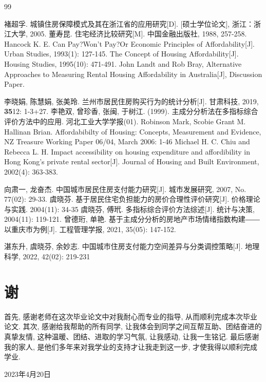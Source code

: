 \documentclass[a4paper, 12pt, twoside]{ctexart}
\def\authorname{许} %
\begin{document}
\begin{thebibliography}{99}
\setlength{\itemsep}{-0.75ex}

褚超孚. 城镇住房保障模式及其在浙江省的应用研究[D]. [硕士学位论文], 浙江：浙江大学, 2005.
董寿昆. 住宅经济比较研究[M]. 中国金融出版社, 1988, 257-258.
Hancock K. E. Can Pay?Won't Pay?Or Economic Principles of Affordability[J]. Urban Studies, 1993(1): 127-145.
The Concept of Housing Affordability[J]. Housing Studies, 1995(10): 471-491.
John Landt and Rob Bray, Alternative Approaches to Measuring Rental Housing Affordability in Australia[J], Discussion Paper.

李晓娟, 陈慧娟, 张美玲. 兰州市居民住房购买行为的统计分析[J]. 甘肃科技, 2019, \textbf{35}12: 1-3+27.
李艳双, 曾珍香, 张闽, 于树江. (1999). 主成分分析法在多指标综合评价方法中的应用. 河北工业大学学报(01).
Robinson Mark, Scobie Grant M. Hallinan Brian. Affordabibilty of Housing: Concepts, Measurement and Evidence, NZ Treasure Working Paper 06/04, March 2006: 1-46
Michael H. C. Chiu and Rebecca L. H. Impact accessibility on housing expenditure and affordibility in Hong Kong's private rental sector[J]. Journal of Housing and Built Environment, 2002(4): 363-383.

向肃一, 龙奋杰. 中国城市居民住房支付能力研究[J]. 城市发展研究, 2007, No. 77(02): 29-33.
虞晓芬. 基于居民住宅负担能力的房价合理性评价研究[J]. 价格理论与实践. 2004(11): 34-35
虞晓芬, 傅玳. 多指标综合评价方法综述[J]. 统计与决策, 2004(11): 119-121.
曾德珩, 单艳. 基于主成分分析的房地产市场情绪指数构建―― 以重庆市为例[J]. 工程管理学报, 2021, 35(05): 147-152.

湛东升, 虞晓芬, 余妙志. 中国城市住房支付能力空间差异与分类调控策略[J]. 地理科学, 2022, 42(02): 219-231

\end{thebibliography}
\newpage
\section*{\quad 谢}
首先, 感谢老师在这次毕业论文中对我耐心而专业的指导, 从而顺利完成本次毕业论文. 其次, 感谢给我帮助的所有同学, 让我体会到同学之间互帮互助、团结奋进的真挚友情, 这种温暖、团结、进取的学习气氛, 让我感动, 让我一生铭记.
最后感谢我的家人, 是他们多年来对我学业的支持才让我走到这一步, 才使我得以顺利完成学业.

\begin{flushright}
    \anon{\authorname}\qquad\mbox{}

    2023年4月20日
\end{flushright}
\end{document}
